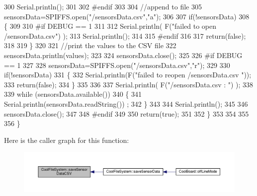\begin{DoxyCode}
300         Serial.println();
301     
302 \textcolor{preprocessor}{    #endif}
303 
304         \textcolor{comment}{//append to file}
305         sensorsData=SPIFFS.open(\textcolor{stringliteral}{"/sensorsData.csv"},\textcolor{stringliteral}{"a"});
306         
307         \textcolor{keywordflow}{if}(!sensorsData)
308         \{
309         
310 \textcolor{preprocessor}{        #if DEBUG == 1}
311             
312             Serial.println( F(\textcolor{stringliteral}{"failed to open /sensorsData.csv"}) );
313             Serial.println();
314 
315 \textcolor{preprocessor}{        #endif}
316             
317             \textcolor{keywordflow}{return}(\textcolor{keyword}{false});
318         
319         \}
320 
321         \textcolor{comment}{//print the values to the CSV file}
322         sensorsData.println(values);
323         
324         sensorsData.close();
325 
326 \textcolor{preprocessor}{    #if DEBUG == 1}
327 
328         sensorsData=SPIFFS.open(\textcolor{stringliteral}{"/sensorsData.csv"},\textcolor{stringliteral}{"r"});
329         
330         \textcolor{keywordflow}{if}(!sensorsData)
331         \{
332             Serial.println(F(\textcolor{stringliteral}{"failed to reopen /sensorsData.csv "}));
333             \textcolor{keywordflow}{return}(\textcolor{keyword}{false});      
334         \}
335 
336         
337         Serial.println( F(\textcolor{stringliteral}{"/sensorsData.csv : "}) );
338 
339         \textcolor{keywordflow}{while} (sensorsData.available()) 
340         \{
341             Serial.println(sensorsData.readString()) ;
342         \}
343         
344         Serial.println();
345         
346         sensorsData.close();
347         
348 \textcolor{preprocessor}{    #endif      }
349         
350         \textcolor{keywordflow}{return}(\textcolor{keyword}{true});
351     
352     \}   
353 
354 
355 
356 \}
\end{DoxyCode}
Here is the caller graph for this function\+:\nopagebreak
\begin{figure}[H]
\begin{center}
\leavevmode
\includegraphics[width=350pt]{db/d0c/class_cool_file_system_ab78704d5d21ce10fc6f1138ab5ab46c8_icgraph}
\end{center}
\end{figure}
\mbox{\label{class_cool_file_system_adfa8e2e80641ae6f0cceabd348a9b841}} 
